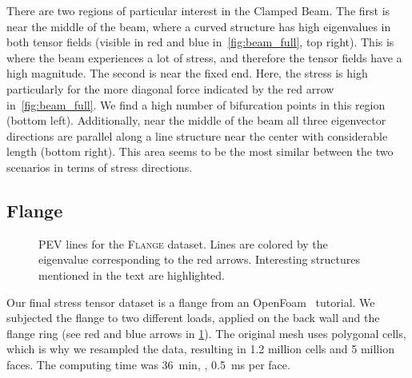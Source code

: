 %
%

%
There are two regions of particular interest in the Clamped Beam.
%
The first is near the middle of the beam, where a curved structure has high
eigenvalues in both tensor fields (visible in red and blue
in~\cref{fig:beam_full}, top right).
%
This is where the beam experiences a lot of stress, and therefore the tensor
fields have a high magnitude.
%
The second is near the fixed end.
%
Here, the stress is high particularly for the more diagonal force indicated by
the red arrow in~\cref{fig:beam_full}.
%
We find a high number of bifurcation points in this region (bottom left).
%
Additionally, near the middle of the beam all three eigenvector directions are
parallel along a line structure near the center with considerable
length (bottom right).
%
This area seems to be the most similar between the two scenarios in terms of
stress directions.
%
%
\subsection{Flange} %
\label{ssub:flange}
%
\begin{figure}
    \setlength\figurewidth\textwidth
    \centering
    
    \caption{\ac{PEV} lines for the \textsc{Flange} dataset. Lines are colored
             by the eigenvalue corresponding to the red arrows. Interesting
             structures mentioned in the text are highlighted.}
    \label{fig:flange_filtered}
\end{figure}
%
%
%
%
%
Our final stress tensor dataset is a flange from an OpenFoam~\cite{OpenFOAMWWW}
tutorial.
%
We subjected the flange to two different loads, applied on the back wall and the
flange ring (see red and blue arrows in \cref{fig:flange_filtered}).
%
The original mesh uses polygonal cells, which is why we resampled the data,
resulting in \num{1.2} million cells and \num{5} million faces.
%
The computing time was \SI{36}{\minute}, \ie, \SI{0.5}{\milli\second} per face.
%

